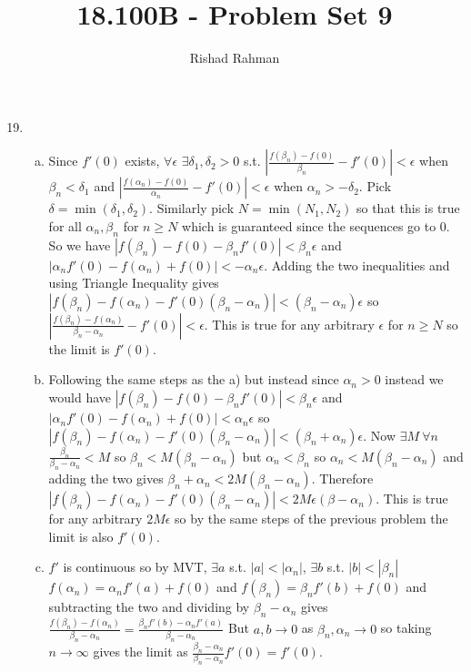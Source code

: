 \documentclass{article}
\begin{document}
\setlength{\abovedisplayskip}{0pt}
\setlength{\belowdisplayskip}{0pt}
\setlength{\abovedisplayshortskip}{0pt}
\setlength{\belowdisplayshortskip}{0pt}
\title{18.100B - Problem Set 9}
\author{Rishad Rahman}
\date{}
\maketitle
\begin{enumerate}
\setcounter{enumi}{18}
\item
\begin{enumerate}[(a)]
\item Since $f'(0)$ exists, $\forall\epsilon$ $\exists \delta_1, \delta_2 > 0$ s.t. $\displaystyle\left|\frac{f(\beta_n)-f(0)}{\beta_n} - f'(0) \right| < \epsilon$ when $\beta_n < \delta_1$ and $\displaystyle\left|\frac{f(\alpha_n)-f(0)}{\alpha_n} - f'(0) \right| < \epsilon$ when $\alpha_n > -\delta_2$. Pick $\delta = \min{(\delta_1, \delta_2)}$. Similarly pick $N=\min{(N_1, N_2)}$ so that this is true for all $\alpha_n, \beta_n$ for $n\geq N$ which is guaranteed since the sequences go to $0$. So we have $|f(\beta_n)-f(0)-\beta_n f'(0)| < \beta_n \epsilon$ and $|\alpha_n f'(0)-f(\alpha_n)+f(0)| < -\alpha_n \epsilon$. Adding the two inequalities and using Triangle Inequality gives $|f(\beta_n)-f(\alpha_n)-f'(0)(\beta_n -\alpha_n)|<(\beta_n - \alpha_n)\epsilon$ so $\left|\displaystyle\frac{f(\beta_n)-f(\alpha_n)}{\beta_n-\alpha_n} - f'(0)\right| < \epsilon$. This is true for any arbitrary $\epsilon$ for $n\geq N$ so the limit is $f'(0)$.\\
\item Following the same steps as the a) but instead since $\alpha_n > 0$ instead we would have $|f(\beta_n)-f(0)-\beta_n f'(0)| < \beta_n \epsilon$ and $|\alpha_n f'(0)-f(\alpha_n)+f(0)| < \alpha_n \epsilon$ so $|f(\beta_n)-f(\alpha_n)-f'(0)(\beta_n -\alpha_n)|<(\beta_n + \alpha_n)\epsilon$. Now $\exists M \ \forall n$ $\displaystyle\frac{\beta_n}{\beta_n-\alpha_n} < M$ so $\beta_n < M(\beta_n-\alpha_n)$ but $\alpha_n < \beta_n$ so $\alpha_n < M(\beta_n - \alpha_n)$ and adding the two gives $\beta_n+\alpha_n < 2M(\beta_n-\alpha_n)$. Therefore $|f(\beta_n)-f(\alpha_n)-f'(0)(\beta_n -\alpha_n)|<2M\epsilon(\beta-\alpha_n)$. This is true for any arbitrary $2M\epsilon$ so by the same steps of the previous problem the limit is also $f'(0)$. \\
\item $f'$ is continuous so by MVT, $\exists a$ s.t. $|a| < |\alpha_n|$, $\exists b$ s.t. $|b| < |\beta_n|$ $f(\alpha_n)=\alpha_n f'(a) + f(0)$ and $f(\beta_n) = \beta_n f'(b) + f(0)$ and subtracting the two and dividing by $\beta_n-\alpha_n$ gives $\displaystyle\frac{f(\beta_n)-f(\alpha_n)}{\beta_n-\alpha_n} = \frac{\beta_nf'(b) -\alpha_nf'(a)}{\beta_n - \alpha_n}$ But $a,b\rightarrow 0$ as $\beta_n, \alpha_n\rightarrow 0$ so taking $n\rightarrow\infty$ gives the limit as $\frac{\beta_n-\alpha_n}{\beta_n-\alpha_n} f'(0) = f'(0)$. \\

\end{enumerate}
\end{enumerate}
\end{document}
